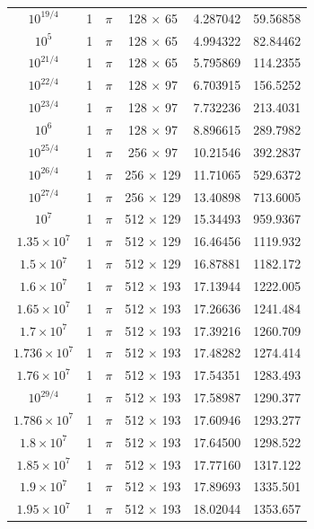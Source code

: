 \documentclass[reprint,amsmath,amssymb,aps]{revtex4-1}
\begin{document}
\begin{longtable*}{cccccc}
    $10^{19/4}$	&	1	&	$\pi$	&	128 $\times$ 65	&	4.287042	&	59.56858\\
    $10^{5}$	&	1	&	$\pi$	&	128 $\times$ 65	&	4.994322	&	82.84462\\
    $10^{21/4}$	&	1	&	$\pi$	&	128 $\times$ 65	&	5.795869	&	114.2355\\
    $10^{22/4}$	&	1	&	$\pi$	&	128 $\times$ 97	&	6.703915	&	156.5252\\
    $10^{23/4}$	&	1	&	$\pi$	&	128 $\times$ 97	&	7.732236	&	213.4031\\
    $10^{6}$	&	1	&	$\pi$	&	128 $\times$ 97	&	8.896615	&	289.7982\\
    $10^{25/4}$	&	1	&	$\pi$	&	256 $\times$ 97	&	10.21546	&	392.2837\\
    $10^{26/4}$	&	1	&	$\pi$	&	256 $\times$ 129	&	11.71065	&	529.6372\\
    $10^{27/4}$	&	1	&	$\pi$	&	256 $\times$ 129	&	13.40898	&	713.6005\\
    $10^{7}$	&	1	&	$\pi$	&	512 $\times$ 129	&	15.34493	&	959.9367\\
    $1.35\times10^{7}$	&	1	&	$\pi$	&	512 $\times$ 129	&	16.46456	&	1119.932\\
    $1.5\times10^{7}$	&	1	&	$\pi$	&	512 $\times$ 129	&	16.87881	&	1182.172\\
    $1.6\times10^{7}$	&	1	&	$\pi$	&	512 $\times$ 193	&	17.13944	&	1222.005\\
    $1.65\times10^{7}$	&	1	&	$\pi$	&	512 $\times$ 193	&	17.26636	&	1241.484\\
    $1.7\times10^{7}$	&	1	&	$\pi$	&	512 $\times$ 193	&	17.39216	&	1260.709\\
    $1.736\times10^{7}$	&	1	&	$\pi$	&	512 $\times$ 193	&	17.48282	&	1274.414\\
    $1.76\times10^{7}$	&	1	&	$\pi$	&	512 $\times$ 193	&	17.54351	&	1283.493\\
    $10^{29/4}$	&	1	&	$\pi$	&	512 $\times$ 193	&	17.58987	&	1290.377\\
    $1.786\times10^{7}$	&	1	&	$\pi$	&	512 $\times$ 193	&	17.60946	&	1293.277\\
    $1.8\times10^{7}$	&	1	&	$\pi$	&	512 $\times$ 193	&	17.64500	&	1298.522\\
    $1.85\times10^{7}$	&	1	&	$\pi$	&	512 $\times$ 193	&	17.77160	&	1317.122\\
    $1.9\times10^{7}$	&	1	&	$\pi$	&	512 $\times$ 193	&	17.89693	&	1335.501\\
    $1.95\times10^{7}$	&	1	&	$\pi$	&	512 $\times$ 193	&	18.02044	&	1353.657\\

\end{longtable*}
\end{document}
